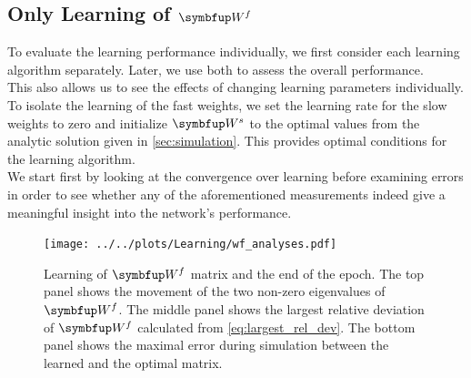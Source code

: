 \subsection{Only Learning of $\bmu{W}^f$}\label{ssec:Wf_res}
To evaluate the learning performance individually, we first consider each learning algorithm separately. Later, we use both to assess the overall performance.\\
This also allows us to see the effects of changing learning parameters individually. To isolate the learning of the fast weights, we set the learning rate for the slow weights to zero and initialize $\bmu{W}^s$ to the optimal values from the analytic solution given in \cref{sec:simulation}. This provides optimal conditions for the learning algorithm.\\
We start first by looking at the convergence over learning before examining errors in order to see whether any of the aforementioned measurements indeed give a meaningful insight into the network's performance.\\

\begin{figure}
	\centering
	\texttt{[image: ../../plots/Learning/wf\_analyses.pdf]}
	\caption{Learning of $\bmu{W}^f$ matrix and the end of the epoch. The top panel shows the movement of the two non-zero eigenvalues of $\bmu{W}^f$. The middle panel shows the largest relative deviation of $\bmu{W}^f$ calculated from \cref{eq:largest_rel_dev}. The bottom panel shows the maximal error during simulation between the learned and the optimal matrix.}
	\label{fig:wf_analyses}
\end{figure}

